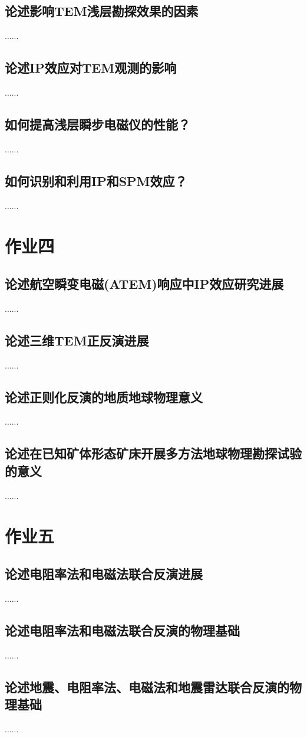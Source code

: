 \documentclass{coursework}
\begin{document}
	\subsection{论述影响TEM浅层勘探效果的因素}
	......
	\subsection{论述IP效应对TEM观测的影响}
	......	
	\subsection{如何提高浅层瞬步电磁仪的性能？}
	......
	\subsection{如何识别和利用IP和SPM效应？}
	......
	\section{作业四}
	\subsection{论述航空瞬变电磁(ATEM)响应中IP效应研究进展}
	......
	\subsection{论述三维TEM正反演进展}
	......
	\subsection{论述正则化反演的地质地球物理意义}
	......
	\subsection{论述在已知矿体形态矿床开展多方法地球物理勘探试验的意义}
	......
	\section{作业五}
	\subsection{论述电阻率法和电磁法联合反演进展}
	......
	\subsection{论述电阻率法和电磁法联合反演的物理基础}
	......
	\subsection{论述地震、电阻率法、电磁法和地震雷达联合反演的物理基础}
	......
\end{document}

